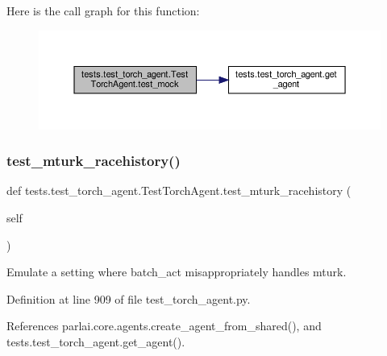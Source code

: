 Here is the call graph for this function\+:
\nopagebreak
\begin{figure}[H]
\begin{center}
\leavevmode
\includegraphics[width=350pt]{classtests_1_1test__torch__agent_1_1TestTorchAgent_a0a7c1df7d947bdc260afa6dad21d78b9_cgraph}
\end{center}
\end{figure}
\mbox{\label{classtests_1_1test__torch__agent_1_1TestTorchAgent_a9954f92efc8cc7a9770f90f3a297d397}} 
\subsubsection{\texorpdfstring{test\+\_\+mturk\+\_\+racehistory()}{test\_mturk\_racehistory()}}
{\footnotesize\ttfamily def tests.\+test\+\_\+torch\+\_\+agent.\+Test\+Torch\+Agent.\+test\+\_\+mturk\+\_\+racehistory (\begin{DoxyParamCaption}\item[{}]{self }\end{DoxyParamCaption})}

\begin{DoxyVerb}Emulate a setting where batch_act misappropriately handles mturk.\end{DoxyVerb}
 

Definition at line 909 of file test\+\_\+torch\+\_\+agent.\+py.



References parlai.\+core.\+agents.\+create\+\_\+agent\+\_\+from\+\_\+shared(), and tests.\+test\+\_\+torch\+\_\+agent.\+get\+\_\+agent().

